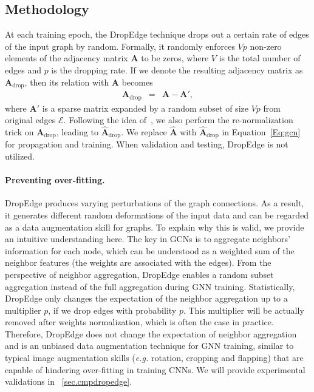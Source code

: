 \documentclass{article}
\def\Eqref#1{Equation~\ref{#1}}
\def\mA{{\bm{A}}}
\begin{document}
\subsection{Methodology}
\label{sec:methodology}
At each training epoch, the DropEdge technique drops out a certain rate of edges of the input graph by random. Formally, it randomly enforces $Vp$ non-zero elements of the adjacency matrix $\mathbf{A}$ to be zeros, where $V$ is the total number of edges and $p$ is the dropping rate. If we denote the resulting adjacency matrix as $\mA_{\text{drop}}$, then its relation with $\mA$ becomes
\begin{eqnarray}
\label{Eq:DropEdge}
\mA_{\text{drop}} &=& \mA-\mA',
\end{eqnarray}
where $\mA'$ is a sparse matrix expanded by a random subset of size $Vp$ from original edges $\mathcal{E}$. Following the idea of~\cite{Kipf2017}, we also perform the re-normalization trick  on $\mA_{\text{drop}}$, leading to $\hat{\mA}_{\text{drop}}$. We replace $\hat{\mA}$ with $\hat{\mA}_{\text{drop}}$ in \Eqref{Eq:gcn} for propagation and training. When validation and testing, DropEdge is not utilized.

\paragraph{Preventing over-fitting.}
DropEdge produces varying perturbations of the graph connections. As a result, it generates different random deformations of the input data and can be regarded as a data augmentation skill for graphs. To explain why this is valid, we provide an intuitive understanding here.
The key in GCNs is to aggregate neighbors' information for each node, which can be understood as a weighted sum of the neighbor features (the weights are associated with the edges). From the perspective of neighbor aggregation, DropEdge enables a random subset aggregation instead of the full aggregation during GNN training. Statistically, DropEdge only changes the expectation of the neighbor aggregation up to a multiplier $p$, if we drop edges with probability $p$. This multiplier will be actually removed after weights normalization, which is often the case in practice. Therefore, DropEdge does not change the expectation of neighbor aggregation and is an unbiased data augmentation technique for GNN training, similar to typical image augmentation skills (\emph{e.g.} rotation, cropping and flapping) that are capable of hindering over-fitting in training CNNs. We will provide experimental validations in \textsection~\ref{sec.cmpdropedge}.
\end{document}
